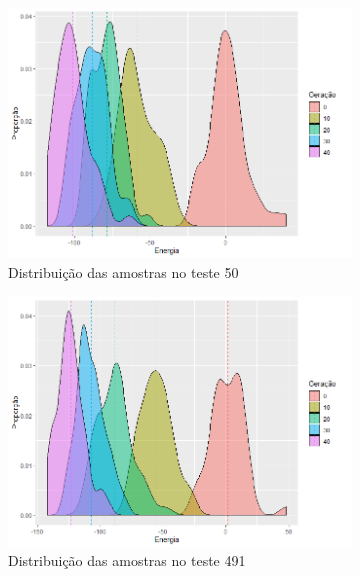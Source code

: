 \begin{figure}[h!]
	\centering
	\begin{subfigure}[b]{0.47\linewidth}
		\includegraphics[width=\linewidth]{imagens/distribuicao_t50.png}
		\caption{Distribuição das amostras no teste 50}
	\end{subfigure}
	\begin{subfigure}[b]{0.47\linewidth}
		\includegraphics[width=\linewidth]{imagens/distribuicao_t491.png}
		\caption{Distribuição das amostras no teste 491}
	\end{subfigure}
	\begin{subfigure}[b]{0.47\linewidth}

\end{subfigure}
\end{figure}
